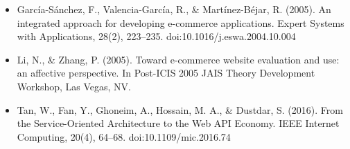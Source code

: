 \begin{itemize}
\item García-Sánchez, F., Valencia-García, R., \& Martínez-Béjar, R. (2005). An integrated approach for developing e-commerce applications. Expert Systems with Applications, 28(2), 223–235. doi:10.1016/j.eswa.2004.10.004 

\item Li, N., \& Zhang, P. (2005). Toward e-commerce website evaluation and use: an affective perspective. In Post-ICIS 2005 JAIS Theory Development Workshop, Las Vegas, NV.

\item Tan, W., Fan, Y., Ghoneim, A., Hossain, M. A., \& Dustdar, S. (2016). From the Service-Oriented Architecture to the Web API Economy. IEEE Internet Computing, 20(4), 64–68. doi:10.1109/mic.2016.74 


\end{itemize}
